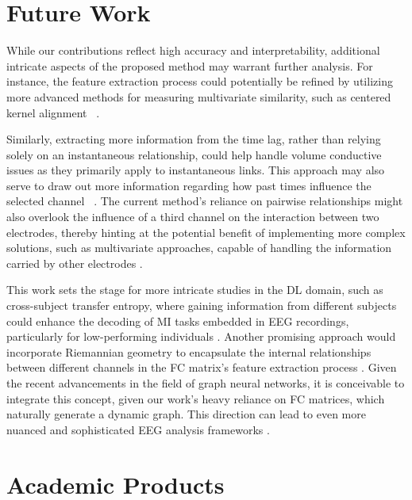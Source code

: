 \section{Future Work}

While our contributions reflect high accuracy and interpretability, additional intricate aspects of the proposed method may warrant further analysis. For instance, the feature extraction process could potentially be refined by utilizing more advanced methods for measuring multivariate similarity, such as centered kernel alignment ~\cite{brockmeier2014neural,alvarez2017kernel}. 

Similarly, extracting more information from the time lag, rather than relying solely on an instantaneous relationship, could help handle volume conductive issues as they primarily apply to instantaneous links. This approach may also serve to draw out more information regarding how past times influence the selected channel ~\cite{uribe2019correntropy,bakhshali2020eeg,de2019data}. The current method's reliance on pairwise relationships might also overlook the influence of a third channel on the interaction between two electrodes, thereby hinting at the potential benefit of implementing more complex solutions, such as multivariate approaches, capable of handling the information carried by other electrodes \cite{vidaurre2023novel}. 

This work sets the stage for more intricate studies in the DL domain, such as cross-subject transfer entropy, where gaining information from different subjects could enhance the decoding of MI tasks embedded in EEG recordings, particularly for low-performing individuals \cite{wei2023sub}. Another promising approach would incorporate Riemannian geometry to encapsulate the internal relationships between different channels in the FC matrix's feature extraction process \cite{carrara2023classification}. Given the recent advancements in the field of graph neural networks, it is conceivable to integrate this concept, given our work's heavy reliance on FC matrices, which naturally generate a dynamic graph. This direction can lead to even more nuanced and sophisticated EEG analysis frameworks \cite{ma2023double}.


\section{Academic Products}

